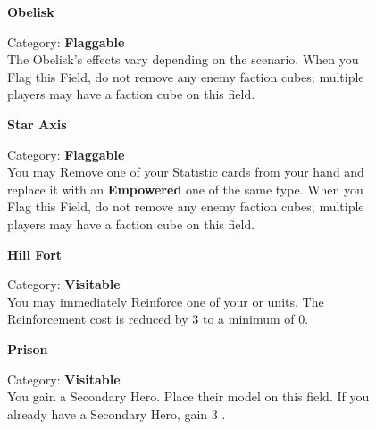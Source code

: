 \begin{figure}[h]
  \begin{minipage}[t]{0.48\textwidth}
    \centering
    \textbf{Obelisk}\\
    \caption{Category: \textbf{Flaggable}\\
      The Obelisk's effects vary depending on the scenario.
      When you Flag this Field, do not remove any enemy faction cubes; multiple players may have a faction cube on this field.}
  \end{minipage}\hfill
  \begin{minipage}[t]{0.48\textwidth}
    \centering
    \textbf{Star Axis}\\
    \caption{Category: \textbf{Flaggable}\\
      You may Remove one of your Statistic cards from your hand and replace it with an \textbf{Empowered} one of the same type.
      When you Flag this Field, do not remove any enemy faction cubes; multiple players may have a faction cube on this field.}
  \end{minipage}
\end{figure}

\begin{figure}
  \begin{minipage}[t]{0.48\textwidth}
    \centering
    \textbf{Hill Fort}\\
    \caption{Category: \textbf{Visitable}\\
      You may immediately Reinforce one of your  or  units.
      The Reinforcement cost is reduced by 3  to a minimum of 0.}
  \end{minipage}\hfill
  \begin{minipage}[t]{0.48\textwidth}
    \centering
    \textbf{Prison}\\
    \caption{Category: \textbf{Visitable}\\
      You gain a Secondary Hero.
      Place their model on this field.
      If you already have a Secondary Hero, gain 3 .}
  \end{minipage}
\end{figure}

